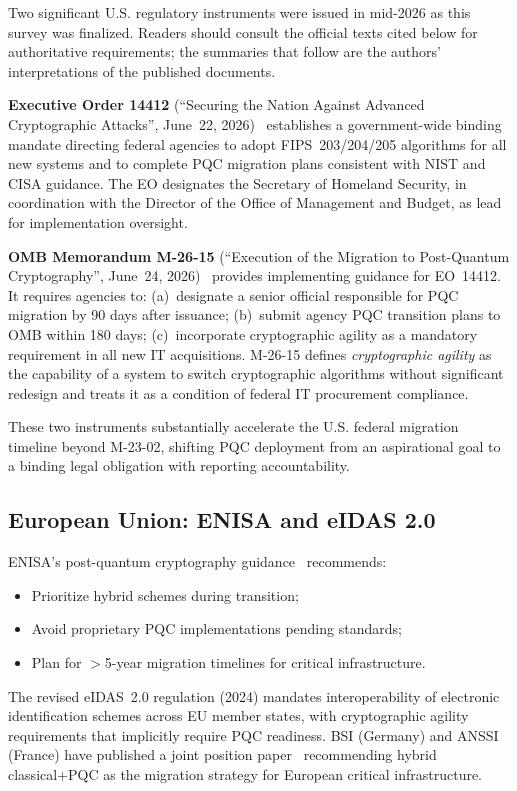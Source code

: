 \documentclass[journal]{IEEEtran}
\begin{document}
Two significant U.S. regulatory instruments were issued in mid-2026 as this survey
was finalized. Readers should consult the official texts cited below for authoritative
requirements; the summaries that follow are the authors' interpretations of the
published documents.

\textbf{Executive Order 14412} (``Securing the Nation Against Advanced Cryptographic
Attacks'', June~22, 2026)~\cite{eo2026pqc} establishes a government-wide binding
mandate directing federal agencies to adopt FIPS~203/204/205 algorithms for all
new systems and to complete PQC migration plans consistent with NIST and CISA
guidance. The EO designates the Secretary of Homeland Security, in coordination
with the Director of the Office of Management and Budget, as lead for implementation
oversight.

\textbf{OMB Memorandum M-26-15} (``Execution of the Migration to Post-Quantum
Cryptography'', June~24, 2026)~\cite{omb2026m2615} provides implementing guidance
for EO~14412. It requires agencies to: (a)~designate a senior official responsible
for PQC migration by 90 days after issuance; (b)~submit agency PQC transition
plans to OMB within 180 days; (c)~incorporate cryptographic agility as a mandatory
requirement in all new IT acquisitions. M-26-15 defines \emph{cryptographic agility}
as the capability of a system to switch cryptographic algorithms without significant
redesign and treats it as a condition of federal IT procurement compliance.

These two instruments substantially accelerate the U.S. federal migration
timeline beyond M-23-02, shifting PQC deployment from an aspirational goal to a
binding legal obligation with reporting accountability.

\subsection{European Union: ENISA and eIDAS 2.0}

ENISA's post-quantum cryptography guidance~\cite{enisa2022pqc} recommends:
\begin{itemize}
  \item Prioritize hybrid schemes during transition;
  \item Avoid proprietary PQC implementations pending standards;
  \item Plan for $>$5-year migration timelines for critical infrastructure.
\end{itemize}

The revised eIDAS~2.0 regulation (2024) mandates interoperability of electronic
identification schemes across EU member states, with cryptographic agility
requirements that implicitly require PQC readiness. BSI (Germany) and ANSSI
(France) have published a joint position paper~\cite{bsianssi2021} recommending
hybrid classical+PQC as the migration strategy for European critical infrastructure.
\end{document}
